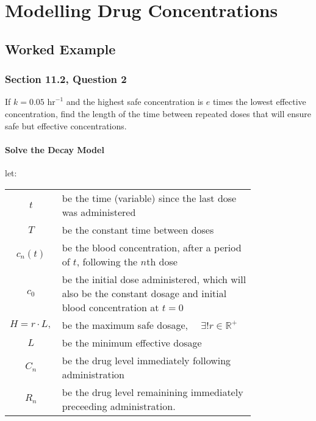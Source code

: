 %
%
%



\section{Modelling Drug Concentrations}
\subsection{Worked Example}
\subsubsection{Section 11.2, Question 2}

If $k = 0.05 \text{ hr}^{-1}$ and the highest safe concentration is $e$ times the lowest effective
concentration, find the length of the time between repeated doses that will
ensure safe but effective concentrations.

\paragraph{Solve the Decay Model}

let:






\begin{tabular}{|cp{0.8\linewidth}}
  $t$ &  be the time (variable) since the last dose was administered \\
    $T$ & be the constant time between doses \\
    $c_n\left( t \right)$ & be the blood concentration, after a period of $t$, following the $n $th dose \\
     $c_0$ & be the initial dose administered, which will also be the constant dosage and initial blood concentration at $t= 0$ \\
     $H= r\cdot L,  $ & be the maximum safe dosage, {\scriptsize $\quad \exists ! r \in \mathbb{R^+}$ }  \\
     $L$ & be the minimum effective dosage\\
     $C_n$ & be the drug level immediately following administration\\
     $R_n$ & be the drug level remainining immediately preceeding administration.
  \end{tabular}
  \ \\




